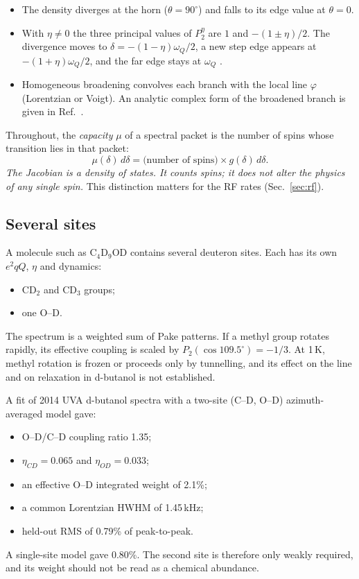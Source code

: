 \documentclass[11pt]{article}
\newcommand{\Pt}{P_2}
\begin{document}
\begin{itemize}
\item The density diverges at the horn ($\theta=90^\circ$) and falls to its edge value at
$\theta=0$.
\item With $\eta\neq0$ the three principal values of $\Pt^\eta$ are $1$ and
$-(1\pm\eta)/2$. The divergence moves to $\delta=-(1-\eta)\omega_Q/2$, a new step edge
appears at $-(1+\eta)\omega_Q/2$, and the far edge stays at $\omega_Q$
\cite{CohenReif1957,Wasylishen2012}.
\item Homogeneous broadening convolves each branch with the local line $\varphi$ (Lorentzian
or Voigt). An analytic complex form of the broadened branch is given in
Ref.~\cite{Dulya1997}.
\end{itemize}

Throughout, the \emph{capacity} $\mu$ of a spectral packet is the number of spins whose
transition lies in that packet:
\[
\mu(\delta)\,d\delta = \text{(number of spins)}\times g(\delta)\,d\delta .
\]
\emph{The Jacobian is a density of states. It counts spins; it does not alter the physics of
any single spin.} This distinction matters for the RF rates (Sec.~\ref{sec:rf}).

\subsection{Several sites}
\label{sec:sites}
A molecule such as C$_4$D$_9$OD contains several deuteron sites. Each has its own $e^2qQ$,
$\eta$ and dynamics:
\begin{itemize}
\item CD$_2$ and CD$_3$ groups;
\item one O--D.
\end{itemize}
The spectrum is a weighted sum of Pake patterns. If a methyl group rotates rapidly, its
effective coupling is scaled by $\Pt(\cos109.5^\circ)=-1/3$. At 1\,K, methyl rotation is
frozen or proceeds only by tunnelling, and its effect on the line and on relaxation in
d-butanol is not established.

A fit of 2014 UVA d-butanol spectra with a two-site (C--D, O--D) azimuth-averaged model gave:
\begin{itemize}
\item O--D/C--D coupling ratio 1.35;
\item $\eta_{CD}=0.065$ and $\eta_{OD}=0.033$;
\item an effective O--D integrated weight of 2.1\%;
\item a common Lorentzian HWHM of 1.45\,kHz;
\item held-out RMS of 0.79\% of peak-to-peak.
\end{itemize}
A single-site model gave 0.80\%. The second site is therefore only weakly required, and its
weight should not be read as a chemical abundance.
\end{document}
